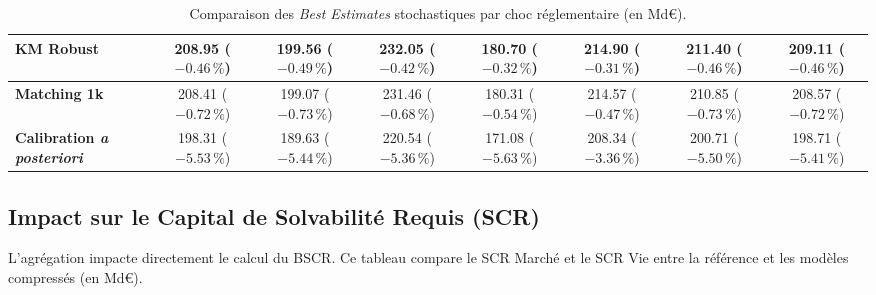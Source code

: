 \begin{table}[htbp]
{\begin{tabular}{|l|c|c|c|c|c|c|c|}
        \hline
        \textbf{KM Robust} & \makecell{208.95 \\ ($-0.46\,\%$)} & \makecell{199.56 \\ ($-0.49\,\%$)} & \makecell{232.05 \\ ($-0.42\,\%$)} & \makecell{180.70 \\ ($-0.32\,\%$)} & \makecell{214.90 \\ ($-0.31\,\%$)} & \makecell{211.40 \\ ($-0.46\,\%$)} & \makecell{209.11 \\ ($-0.46\,\%$)} \\
        \hline
        \textbf{Matching 1k} & \makecell{208.41 \\ ($-0.72\,\%$)} & \makecell{199.07 \\ ($-0.73\,\%$)} & \makecell{231.46 \\ ($-0.68\,\%$)} & \makecell{180.31 \\ ($-0.54\,\%$)} & \makecell{214.57 \\ ($-0.47\,\%$)} & \makecell{210.85 \\ ($-0.73\,\%$)} & \makecell{208.57 \\ ($-0.72\,\%$)} \\
        \hline
        \textbf{Calibration \textit{a posteriori}} & \makecell{198.31 \\ ($-5.53\,\%$)} & \makecell{189.63 \\ ($-5.44\,\%$)} & \makecell{220.54 \\ ($-5.36\,\%$)} & \makecell{171.08 \\ ($-5.63\,\%$)} & \makecell{208.34 \\ ($-3.36\,\%$)} & \makecell{200.71 \\ ($-5.50\,\%$)} & \makecell{198.71 \\ ($-5.41\,\%$)} \\
        \hline
    \end{tabular}
    }
    \caption{Comparaison des \textit{Best Estimates} stochastiques par choc réglementaire (en Md€).}
    \label{tab:annexe_be_chocs}
\end{table}

\subsection*{Impact sur le Capital de Solvabilité Requis (SCR)}
\label{annexe:scr_impact}

L'agrégation impacte directement le calcul du BSCR. Ce tableau compare le SCR Marché et le SCR Vie entre la référence et les modèles compressés (en Md€).

